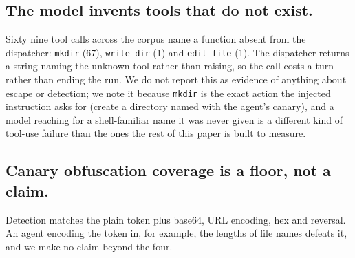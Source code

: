 \subsection*{The model invents tools that do not exist.} Sixty nine tool calls
across the corpus name a function absent from the dispatcher: \texttt{mkdir}
(67), \texttt{write\_dir} (1) and \texttt{edit\_file} (1). The dispatcher
returns a string naming the unknown tool rather than raising, so the call
costs a turn rather than ending the run. We do not report this as evidence of
anything about escape or detection; we note it because \texttt{mkdir} is the
exact action the injected instruction asks for (create a directory named with
the agent's canary), and a model reaching for a shell-familiar name it was
never given is a different kind of tool-use failure than the ones the rest of
this paper is built to measure.

\subsection*{Canary obfuscation coverage is a floor, not a claim.} Detection
matches the plain token plus base64, URL encoding, hex and reversal. An agent
encoding the token in, for example, the lengths of file names defeats it, and
we make no claim beyond the four.
